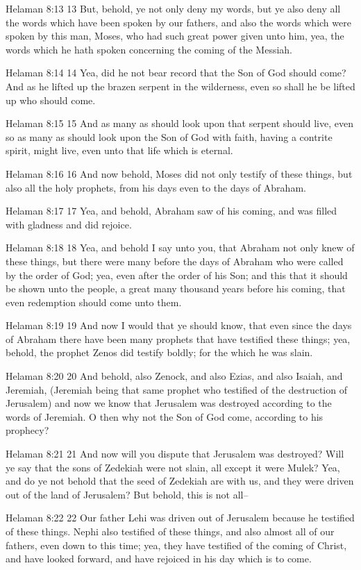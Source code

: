 Helaman 8:13
 13 But, behold, ye not only deny my words, but ye also deny all
the words which have been spoken by our fathers, and also the
words which were spoken by this man, Moses, who had such great
power given unto him, yea, the words which he hath spoken
concerning the coming of the Messiah.

Helaman 8:14
 14 Yea, did he not bear record that the Son of God should come?
And as he lifted up the brazen serpent in the wilderness, even so
shall he be lifted up who should come.

Helaman 8:15
 15 And as many as should look upon that serpent should live,
even so as many as should look upon the Son of God with faith,
having a contrite spirit, might live, even unto that life which
is eternal.

Helaman 8:16
 16 And now behold, Moses did not only testify of these things,
but also all the holy prophets, from his days even to the days of
Abraham.

Helaman 8:17
 17 Yea, and behold, Abraham saw of his coming, and was filled
with gladness and did rejoice.

Helaman 8:18
 18 Yea, and behold I say unto you, that Abraham not only knew of
these things, but there were many before the days of Abraham who
were called by the order of God; yea, even after the order of his
Son; and this that it should be shown unto the people, a great
many thousand years before his coming, that even redemption
should come unto them.

Helaman 8:19
 19 And now I would that ye should know, that even since the days
of Abraham there have been many prophets that have testified
these things; yea, behold, the prophet Zenos did testify boldly;
for the which he was slain.

Helaman 8:20
 20 And behold, also Zenock, and also Ezias, and also Isaiah, and
Jeremiah, (Jeremiah being that same prophet who testified of the
destruction of Jerusalem) and now we know that Jerusalem was
destroyed according to the words of Jeremiah. O then why not the
Son of God come, according to his prophecy?

Helaman 8:21
 21 And now will you dispute that Jerusalem was destroyed? Will
ye say that the sons of Zedekiah were not slain, all except it
were Mulek? Yea, and do ye not behold that the seed of Zedekiah
are with us, and they were driven out of the land of Jerusalem?
But behold, this is not all--

Helaman 8:22
 22 Our father Lehi was driven out of Jerusalem because he
testified of these things. Nephi also testified of these things,
and also almost all of our fathers, even down to this time; yea,
they have testified of the coming of Christ, and have looked
forward, and have rejoiced in his day which is to come.

